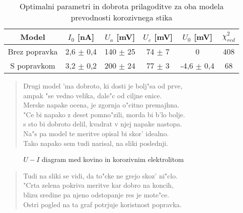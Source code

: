 \documentclass[a4paper,10pt]{article}
\begin{document}
\begin{table}[h]
 \centering
\begin{tabular}{|c|c|c|c|c|c|}
\hline
Model & $I_0$ [nA] & $U_a$ [mV] & $U_c$ [mV] & $U_0$ [mV] & $\chi^2_{red}$ \\
\hline
Brez popravka & 2,6 $\pm$ 0,4 & 140 $\pm$ 25 & 74 $\pm$ 7 & 0 & 408 \\
S popravkom & 3,2 $\pm$ 0,2 & 200 $\pm$ 24 & 77 $\pm$ 3 & -4,6 $\pm$ 0,4 & 68 \\
\hline
\end{tabular}
\caption{Optimalni parametri in dobrota prilagoditve za oba modela prevodnosti korozivnega stika}
\end{table}

\begin{verse}
 Drugi model 'ma dobroto, ki dosti je bolj"sa od prve, \\
 ampak "se vedno velika, dale"c od ciljne enice. \\
 Merske napake ocena, je zgornja o"citno premajhna. \\
 "Ce bi napako z deset pomno"zili, morda bi b'lo bolje. \\
 s sto bi dobroto delil, kvadrat v njej napake nastopa. \\
 Na"s pa model te meritve opisal bi skor' idealno. \\
 Tako napako sem tudi narisal, na sliki poslednji. 
\end{verse}

\begin{figure}[h]
 
 \caption{$U-I$ diagram med kovino in korozivnim elektrolitom}
 \label{fig:korozija}
\end{figure}

\newpage

\begin{verse}
 Tudi na sliki se vidi, da to"cke ne grejo skoz' ni"clo. \\
 "Crta zelena pokriva meritve kar dobro na koncih,\\
 blizu sredine pa njeno odstopanje res je mote"ce. \\
 Ostri pogled na ta graf potrjuje koristnost popravka. 
\end{verse}
\end{document}
